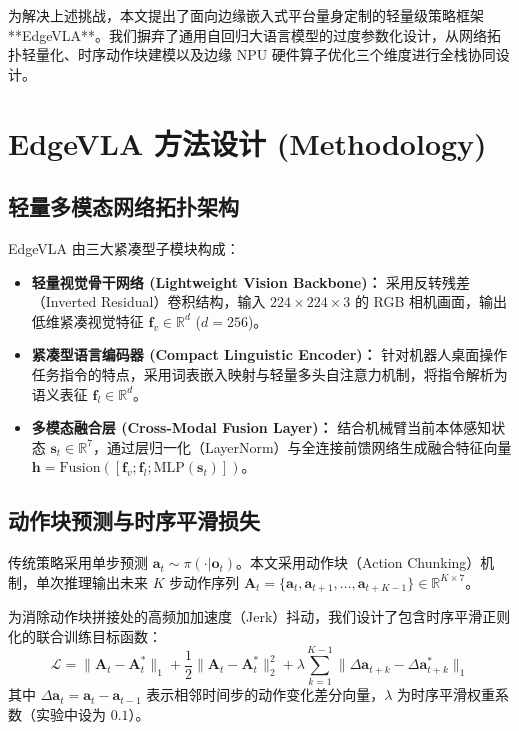 \documentclass[UTF8,10pt,twocolumn]{ctexart}
\begin{document}
为解决上述挑战，本文提出了面向边缘嵌入式平台量身定制的轻量级策略框架 **EdgeVLA**。我们摒弃了通用自回归大语言模型的过度参数化设计，从网络拓扑轻量化、时序动作块建模以及边缘 NPU 硬件算子优化三个维度进行全栈协同设计。

\section{EdgeVLA 方法设计 (Methodology)}

\subsection{轻量多模态网络拓扑架构}
EdgeVLA 由三大紧凑型子模块构成：
\begin{itemize}
    \item \textbf{轻量视觉骨干网络 (Lightweight Vision Backbone)：} 采用反转残差（Inverted Residual）卷积结构，输入 $224 \times 224 \times 3$ 的 RGB 相机画面，输出低维紧凑视觉特征 $\mathbf{f}_v \in \mathbb{R}^{d}$ ($d=256$)。
    \item \textbf{紧凑型语言编码器 (Compact Linguistic Encoder)：} 针对机器人桌面操作任务指令的特点，采用词表嵌入映射与轻量多头自注意力机制，将指令解析为语义表征 $\mathbf{f}_l \in \mathbb{R}^{d}$。
    \item \textbf{多模态融合层 (Cross-Modal Fusion Layer)：} 结合机械臂当前本体感知状态 $\mathbf{s}_t \in \mathbb{R}^{7}$，通过层归一化（LayerNorm）与全连接前馈网络生成融合特征向量 $\mathbf{h} = \text{Fusion}([\mathbf{f}_v; \mathbf{f}_l; \text{MLP}(\mathbf{s}_t)])$。
\end{itemize}

\subsection{动作块预测与时序平滑损失}
传统策略采用单步预测 $\mathbf{a}_t \sim \pi(\cdot | \mathbf{o}_t)$。本文采用动作块（Action Chunking）机制，单次推理输出未来 $K$ 步动作序列 $\mathbf{A}_t = \{\mathbf{a}_t, \mathbf{a}_{t+1}, \dots, \mathbf{a}_{t+K-1}\} \in \mathbb{R}^{K \times 7}$。

为消除动作块拼接处的高频加加速度（Jerk）抖动，我们设计了包含时序平滑正则化的联合训练目标函数：
\begin{equation}
\mathcal{L} = \|\mathbf{A}_t - \mathbf{A}_t^*\|_1 + \frac{1}{2}\|\mathbf{A}_t - \mathbf{A}_t^*\|_2^2 + \lambda \sum_{k=1}^{K-1} \|\Delta \mathbf{a}_{t+k} - \Delta \mathbf{a}_{t+k}^*\|_1
\end{equation}
其中 $\Delta \mathbf{a}_t = \mathbf{a}_{t} - \mathbf{a}_{t-1}$ 表示相邻时间步的动作变化差分向量，$\lambda$ 为时序平滑权重系数（实验中设为 $0.1$）。
\end{document}

